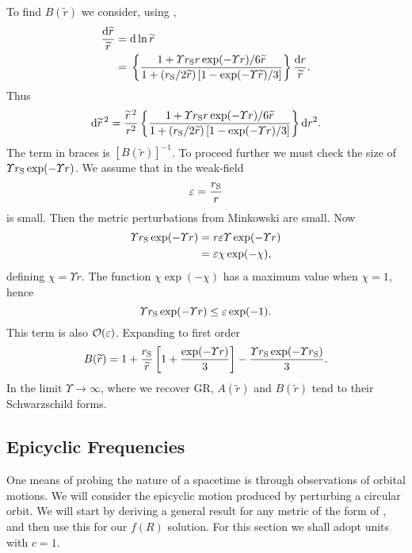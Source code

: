 To find $B(\widetilde{r})$ we consider, using ,
\begin{align}
\frac{\mathrm{d} \widetilde{r}}{\widetilde{r}} = {} & \mathrm{d} \ln \widetilde{r} \nonumber \\
 = {} & \left\{\frac{1 + {\Upsilon r_\mathrm{S}r\exp(-\Upsilon r)}/{6\widetilde{r}}}{1 + ({r_\mathrm{S}}/{2\widetilde{r}})\left[1 - {\exp(-\Upsilon \widetilde{r})}/{3}\right]}\right\}\frac{\mathrm{d} r}{\widetilde{r}}.
\end{align}
Thus
\begin{equation}
\mathrm{d} \widetilde{r}^{\,2} = \frac{\widetilde{r}^{\,2}}{r^2}\left\{\frac{1 + {\Upsilon r_\mathrm{S}r\exp(-\Upsilon r)}/{6\widetilde{r}}}{1 + ({r_\mathrm{S}}/{2\widetilde{r}})\left[1 - {\exp(-\Upsilon r)}/{3}\right]}\right\}\mathrm{d} r^2.
\end{equation}
The term in braces is $\left[B(\widetilde{r})\right]^{-1}$. To proceed further we must check the size of $\Upsilon r_\mathrm{S}\exp(-\Upsilon r)$. We assume that in the weak-field
\begin{equation}
\varepsilon = \frac{r_\mathrm{S}}{r}
\end{equation}
is small. Then the metric perturbations from Minkowski are small. Now
\begin{align}
\Upsilon r_\mathrm{S}\exp(-\Upsilon r) = {} & r\varepsilon\Upsilon\exp(-\Upsilon r) \nonumber \\
 = {} & \varepsilon\chi\exp(-\chi),
\end{align}
defining $\chi = \Upsilon r$. The function $\chi\exp(-\chi)$ has a maximum value when $\chi = 1$, hence
\begin{equation}
\Upsilon r_\mathrm{S}\exp(-\Upsilon r) \leq \varepsilon\exp(-1).
\end{equation}
This term is also $\mathcal{O}({\varepsilon})$. Expanding to first order\cite{Olmo2007c}
\begin{equation}
B(\widetilde{r})  = 1 + \frac{r_\mathrm{S}}{\widetilde{r}}\left[1 + \frac{\exp(-\Upsilon r )}{3}\right] - \frac{\Upsilon r_\mathrm{S} \exp(-\Upsilon r_\mathrm{S})}{3}.
\label{eq:B_metric}
\end{equation}
In the limit $\Upsilon \rightarrow \infty$, where we recover GR, $A(\widetilde{r})$ and $B(\widetilde{r})$ tend to their Schwarzschild forms.

\subsection{Epicyclic Frequencies}\label{sec:Epicycle}

One means of probing the nature of a spacetime is through observations of orbital motions\cite{Gair2008a}. We will consider the epicyclic motion produced by perturbing a circular orbit. We will start by deriving a general result for any metric of the form of , and then use this for our $f(R)$ solution. For this section we shall adopt units with $c = 1$.

